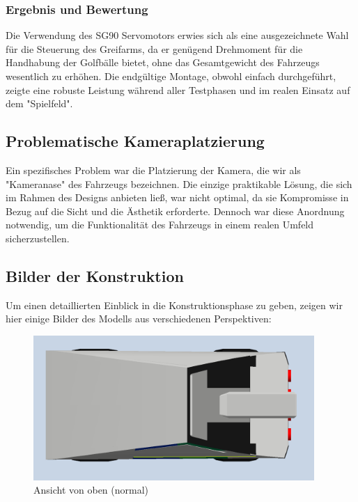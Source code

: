 \subsubsection{Ergebnis und Bewertung}
Die Verwendung des SG90 Servomotors erwies sich als eine ausgezeichnete Wahl für die Steuerung des Greifarms, da er genügend Drehmoment für die Handhabung der Golfbälle bietet, ohne das Gesamtgewicht des Fahrzeugs wesentlich zu erhöhen. Die endgültige Montage, obwohl einfach durchgeführt, zeigte eine robuste Leistung während aller Testphasen und im realen Einsatz auf dem "Spielfeld".

\subsection{Problematische Kameraplatzierung}
Ein spezifisches Problem war die Platzierung der Kamera, die wir als "Kameranase" des Fahrzeugs bezeichnen. Die einzige praktikable Lösung, die sich im Rahmen des Designs anbieten ließ, war nicht optimal, da sie Kompromisse in Bezug auf die Sicht und die Ästhetik erforderte. Dennoch war diese Anordnung notwendig, um die Funktionalität des Fahrzeugs in einem realen Umfeld sicherzustellen.

\subsection{Bilder der Konstruktion}
Um einen detaillierten Einblick in die Konstruktionsphase zu geben, zeigen wir hier einige Bilder des Modells aus verschiedenen Perspektiven:

\newpage

\begin{figure}[h]
    \centering
    \includegraphics[width=0.95\textwidth]{Resources/oben_normal.png}
    \caption{Ansicht von oben (normal)}
\end{figure}

